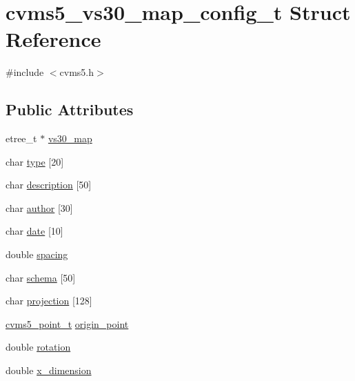 \hypertarget{structcvms5__vs30__map__config__t}{\section{cvms5\+\_\+vs30\+\_\+map\+\_\+config\+\_\+t Struct Reference}
\label{structcvms5__vs30__map__config__t}
}


{\ttfamily \#include $<$cvms5.\+h$>$}

\subsection*{Public Attributes}
\begin{DoxyCompactItemize}
\item 
etree\+\_\+t $\ast$ \hyperlink{structcvms5__vs30__map__config__t_ac153f642d35d4addab203a52c6838df6}{vs30\+\_\+map}
\item 
char \hyperlink{structcvms5__vs30__map__config__t_a669c0c99c3a128deb94766c5b0ea99bd}{type} \mbox{[}20\mbox{]}
\item 
char \hyperlink{structcvms5__vs30__map__config__t_a12be3490a8d3d89d49aff97b3660eb09}{description} \mbox{[}50\mbox{]}
\item 
char \hyperlink{structcvms5__vs30__map__config__t_a5bdb44f5fb4330604eaed53b66234d91}{author} \mbox{[}30\mbox{]}
\item 
char \hyperlink{structcvms5__vs30__map__config__t_ac6c3bc1021b77a9b17c4786288a54e4a}{date} \mbox{[}10\mbox{]}
\item 
double \hyperlink{structcvms5__vs30__map__config__t_a9a84e5fbc499c465fc505bf090ac9cec}{spacing}
\item 
char \hyperlink{structcvms5__vs30__map__config__t_a186905cd6b487d3516adf5aefefe229d}{schema} \mbox{[}50\mbox{]}
\item 
char \hyperlink{structcvms5__vs30__map__config__t_a37eb5ce940370c942f10dab9e14effa0}{projection} \mbox{[}128\mbox{]}
\item 
\hyperlink{structcvms5__point__t}{cvms5\+\_\+point\+\_\+t} \hyperlink{structcvms5__vs30__map__config__t_af7d7654d3387586f67b6e7f3a2c5567d}{origin\+\_\+point}
\item 
double \hyperlink{structcvms5__vs30__map__config__t_ad313fa911aea273ec3c5adbb334590a8}{rotation}
\item 
double \hyperlink{structcvms5__vs30__map__config__t_aec8944642bfdb88ee31a579354017aa4}{x\+\_\+dimension}
\item 

\end{DoxyCompactItemize}
